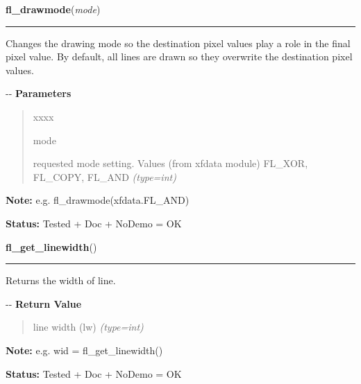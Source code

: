\hspace{.8\funcindent}\begin{boxedminipage}{\funcwidth}

    \raggedright \textbf{fl\_drawmode}(\textit{mode})

    \vspace{-1.5ex}

    \rule{\textwidth}{0.5\fboxrule}
\setlength{\parskip}{2ex}

Changes the drawing mode so the destination pixel values play a role
in the final pixel value. By default, all lines are drawn so they
overwrite the destination pixel values.

-{}-
\setlength{\parskip}{1ex}
      \textbf{Parameters}
      \vspace{-1ex}

      \begin{quote}
        \begin{Ventry}{xxxx}

          \item[mode]


requested mode setting. Values (from xfdata module) FL\_XOR, FL\_COPY,
FL\_AND
            {\it (type=int)}

        \end{Ventry}

      \end{quote}

\textbf{Note:} 
e.g. fl\_drawmode(xfdata.FL\_AND)


\textbf{Status:} 
Tested + Doc + NoDemo = OK


    \end{boxedminipage}

    \label{xformslib:flxbasic:fl_get_linewidth}

    \vspace{0.5ex}

\hspace{.8\funcindent}\begin{boxedminipage}{\funcwidth}

    \raggedright \textbf{fl\_get\_linewidth}()

    \vspace{-1.5ex}

    \rule{\textwidth}{0.5\fboxrule}
\setlength{\parskip}{2ex}

Returns the width of line.

-{}-
\setlength{\parskip}{1ex}
      \textbf{Return Value}
    \vspace{-1ex}

      \begin{quote}

line width (lw)
      {\it (type=int)}

      \end{quote}

\textbf{Note:} 
e.g. wid = fl\_get\_linewidth()


\textbf{Status:} 
Tested + Doc + NoDemo = OK


    \end{boxedminipage}

